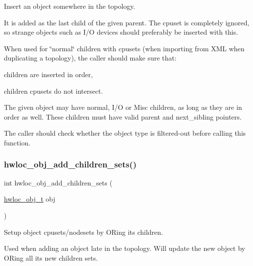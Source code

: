 Insert an object somewhere in the topology. 

It is added as the last child of the given parent. The cpuset is completely ignored, so strange objects such as I/O devices should preferably be inserted with this.

When used for \char`\"{}normal\char`\"{} children with cpusets (when importing from X\+ML when duplicating a topology), the caller should make sure that\+:
\begin{DoxyItemize}
\item children are inserted in order,
\item children cpusets do not intersect.
\end{DoxyItemize}

The given object may have normal, I/O or Misc children, as long as they are in order as well. These children must have valid parent and next\+\_\+sibling pointers.

The caller should check whether the object type is filtered-\/out before calling this function. \mbox{\label{a00230_ga754b61041ceee9685534a2c5d3cd0156}} 
\subsubsection{\texorpdfstring{hwloc\+\_\+obj\+\_\+add\+\_\+children\+\_\+sets()}{hwloc\_obj\_add\_children\_sets()}}
{\footnotesize\ttfamily int hwloc\+\_\+obj\+\_\+add\+\_\+children\+\_\+sets (\begin{DoxyParamCaption}\item[{\hyperlink{a00185_ga79b8ab56877ef99ac59b833203391c7d}{hwloc\+\_\+obj\+\_\+t}}]{obj }\end{DoxyParamCaption})}



Setup object cpusets/nodesets by OR\textquotesingle{}ing its children. 

Used when adding an object late in the topology. Will update the new object by OR\textquotesingle{}ing all its new children sets.

